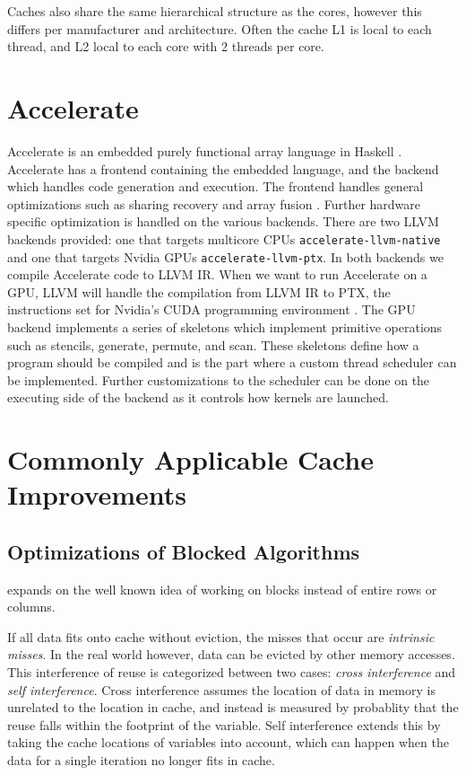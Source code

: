 Caches also share the same hierarchical structure as the cores, however this differs per manufacturer and architecture.
Often the cache L1 is local to each thread, and L2 local to each core with 2 threads per core.

\section{Accelerate}
\label{sec:accelerate}
Accelerate is an embedded purely functional array language in Haskell \cite{chakravarty2011accelerating}.
Accelerate has a frontend containing the embedded language, and the backend which handles code generation and execution.
The frontend handles general optimizations such as sharing recovery and array fusion \cite{mcdonell2013optimising,balen2020optimal}.
Further hardware specific optimization is handled on the various backends.
There are two LLVM \cite{llvm} backends provided: one that targets multicore CPUs \texttt{accelerate-llvm-native} and one that targets Nvidia GPUs \texttt{accelerate-llvm-ptx}.
In both backends we compile Accelerate code to LLVM IR.
When we want to run Accelerate on a GPU, LLVM will handle the compilation from LLVM IR to PTX, the instructions set for Nvidia's CUDA programming environment \cite{mcdonell2015type, llvm, nvidia2021cudadocs}.
The GPU backend implements a series of skeletons which implement primitive operations such as stencils, generate, permute, and scan.
These skeletons define how a program should be compiled and is the part where a custom thread scheduler can be implemented.
Further customizations to the scheduler can be done on the executing side of the backend as it controls how kernels are launched.

\section{Commonly Applicable Cache Improvements}

\subsection{Optimizations of Blocked Algorithms}
\label{sec:optimization_blocked}
\citeauthor{lam1991cache} expands on the well known idea of working on blocks instead of entire rows or columns.

If all data fits onto cache without eviction, the misses that occur are \textit{intrinsic misses}.
In the real world however, data can be evicted by other memory accesses.
This interference of reuse is categorized between two cases: \textit{cross interference} and \textit{self interference}.
Cross interference assumes the location of data in memory is unrelated to the location in cache, and instead is measured by probablity that the reuse falls within the footprint of the variable.
Self interference extends this by taking the cache locations of variables into account, which can happen when the data for a single iteration no longer fits in cache.
\cite{lam1991cache}

